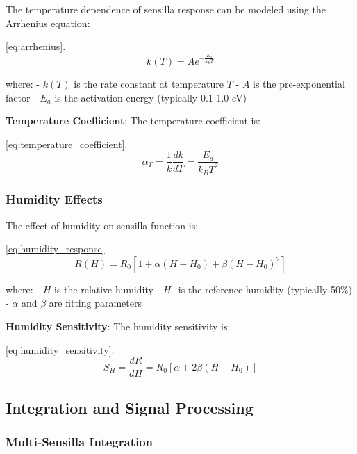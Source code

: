 \documentclass[
  13pt,
  a4paperpaper,
  12pt]{article}
\begin{document}
The temperature dependence of sensilla response can be modeled using the
Arrhenius equation:

\eqref{eq:arrhenius}. \begin{equation}
k(T) = A e^{-\frac{E_a}{k_B T}} \label{eq:arrhenius}
\end{equation}

where: - \(k(T)\) is the rate constant at temperature \(T\) - \(A\) is
the pre-exponential factor - \(E_a\) is the activation energy (typically
0.1-1.0 eV)

\textbf{Temperature Coefficient}: The temperature coefficient is:

\eqref{eq:temperature_coefficient}. \begin{equation}
\alpha_T = \frac{1}{k} \frac{dk}{dT} = \frac{E_a}{k_B T^2} \label{eq:temperature_coefficient}
\end{equation}

\subsubsection{Humidity Effects}\label{humidity-effects}

The effect of humidity on sensilla function is:

\eqref{eq:humidity_response}. \begin{equation}
R(H) = R_0 \left[1 + \alpha(H - H_0) + \beta(H - H_0)^2\right] \label{eq:humidity_response}
\end{equation}

where: - \(H\) is the relative humidity - \(H_0\) is the reference
humidity (typically 50\%) - \(\alpha\) and \(\beta\) are fitting
parameters

\textbf{Humidity Sensitivity}: The humidity sensitivity is:

\eqref{eq:humidity_sensitivity}. \begin{equation}
S_H = \frac{dR}{dH} = R_0 [\alpha + 2\beta(H - H_0)] \label{eq:humidity_sensitivity}
\end{equation}

\subsection{Integration and Signal
Processing}\label{integration-and-signal-processing}

\subsubsection{Multi-Sensilla
Integration}\label{multi-sensilla-integration}
\end{document}
